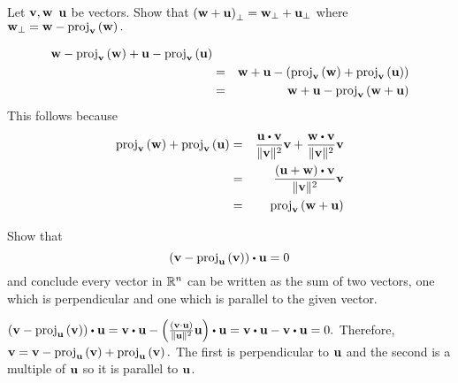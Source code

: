\begin{enumialphparenastyle}
\begin{ex} \label{perplinear} Let ${\bf v},{\bf w}$ ${\bf u}$ be vectors. Show
that $\left({\bf w}+{\bf u}\right) _{\perp }={\bf w}_{\perp }+{\bf u}_{\perp }$
 where ${\bf w}_{\perp }={\bf w}-\mbox{proj}_{{\bf v}}\left({\bf w}\right) .$
\begin{sol}
\begin{eqnarray*}
{\bf w}-\mbox{proj}_{{\bf v}}\left({\bf w}\right) +{\bf u}- \mbox{proj}_{{\bf v}}\left({\bf u}\right) \\
&=&{\bf w}+{\bf u}-\left(\mbox{proj}_{{\bf v}}\left({\bf w}\right) +\mbox{proj}_{{\bf v}}\left({\bf u}\right) \right) \\
&=&{\bf w}+{\bf u}-\mbox{proj}_{{\bf v}}\left({\bf w}+{\bf u}\right) 
\end{eqnarray*}
This follows because 
\begin{eqnarray*}
\func{proj}_{\vect{v}}\tup{\vect{w}} +\func{proj}_{\vect{v}}\tup{
\vect{u}} &=& \frac{\vect{u}\dotprod \vect{v}}{\vectlength \vect{v}\vectlength ^{2}}\vect{v}+
\frac{\vect{w}\dotprod \vect{v}}{\vectlength \vect{v}\vectlength ^{2}}\vect{v} \\
&=& \frac{\tup{\vect{u}+\vect{w}} \dotprod \vect{v}}{\vectlength \vect{v}
\vectlength ^{2}}\vect{v} \\
&=& \func{proj}_{\vect{v}}\tup{\vect{w}+\vect{u}}
\end{eqnarray*}
\end{sol}
\end{ex}

\begin{ex} Show that
\begin{equation*}
 \tup{\vect{v}-\func{proj}_{\vect{u}
}\tup{\vect{v}} } \dotprod \vect{u}=0
\end{equation*}
and conclude every vector in $\mathbb{R}^{n}$ can be written as the sum of
two vectors, one which is perpendicular and one which is parallel to the
given vector.
\begin{sol}
$\tup{\vect{v}-\func{proj}_{\vect{u}}\tup{\vect{v}} } \dotprod \vect{u} =  \vect{v} \dotprod \vect{u} -\tup{\frac{\tup{\vect{v\cdot u}} }{\vectlength \vect{u} \vectlength ^{2}}\vect{u} } \dotprod \vect{u} = \vect{v} \dotprod \vect{u} - \vect{v} \dotprod \vect{u} =0.$ Therefore, ${\bf v} = {\bf v} - \mbox{proj}_{{\bf u}}\left({\bf v}\right) + \mbox{proj}_{{\bf u}}\left({\bf v}\right).$ The first is perpendicular to ${\bf u}$ and the second is a multiple
of ${\bf u}$ so it is parallel to ${\bf u}$.
\end{sol}
\end{ex}

\end{enumialphparenastyle}